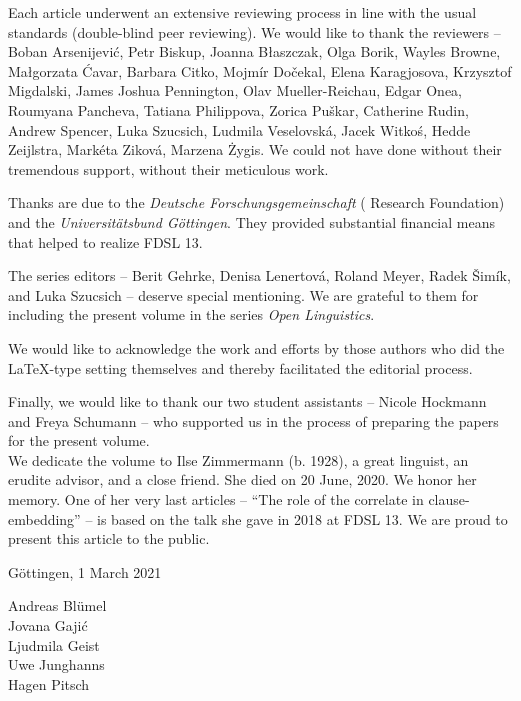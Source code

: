 
Each article underwent an extensive reviewing process in line with the usual standards (double-blind peer reviewing). We would like to thank the reviewers -- Boban Arsenijević, Petr Biskup, Joanna Błaszczak, Olga Borik, Wayles Browne, Małgorzata Ćavar, Barbara Citko, Mojmír Dočekal, Elena Karagjosova, Krzysztof Migdalski, James Joshua Pennington, Olav Mueller-Reichau, Edgar Onea, Roum\-yana Pancheva, Tatiana Philippova, Zorica Puškar, Catherine Rudin, Andrew Spencer, Luka Szucsich, Ludmila Veselovská, Jacek Witkoś, Hedde Zeijlstra, \linebreak Markéta Ziková, Marzena Żygis. We could not have done without their tremendous support, without their meticulous work.

Thanks are due to the \textit{Deutsche Forschungsgemeinschaft} ( Research Foundation) and the \textit{Universitätsbund Göttingen}. They provided substantial financial means that helped to realize FDSL 13.

The series editors -- Berit Gehrke, Denisa Lenertová, Roland Meyer, Radek Šimík, and Luka Szucsich -- deserve special mentioning. We are grateful to them for including the present volume in the series \textit{Open  Linguistics}.

We would like to acknowledge the work and efforts by those authors who did the \LaTeX-type setting themselves and thereby facilitated the editorial process.

Finally, we would like to thank our two student assistants -- Nicole Hockmann and Freya Schumann -- who supported us in the process of preparing the papers for the present volume.\\

\noindent We dedicate the volume to Ilse Zimmermann (b. 1928), a great linguist, an erudite advisor, and a close friend. She died on 20 June, 2020. We honor her memory. One of her very last articles – ``The role of the correlate in clause-embedding'' – is based on the talk she gave in 2018 at FDSL 13. We are proud to present this article to the public.

\null\hfill Göttingen, 1 March 2021

\null\hfill Andreas Blümel\\
\null\hfill Jovana Gajić\\
\null\hfill Ljudmila Geist\\
\null\hfill Uwe Junghanns\\
\null\hfill Hagen Pitsch\\

% 
